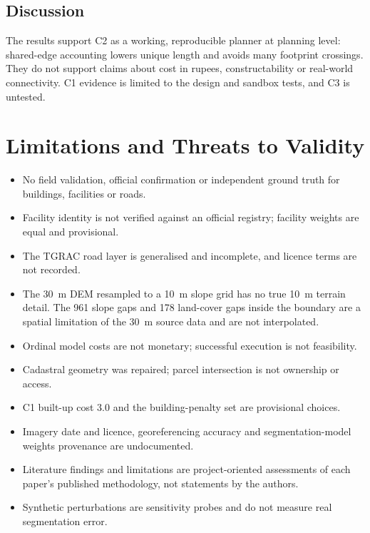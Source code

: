 \documentclass[12pt,a4paper]{report}
\begin{document}
\section{Discussion}
The results support C2 as a working, reproducible planner at planning level: shared-edge accounting lowers unique length and avoids many footprint crossings. They do not support claims about cost in rupees, constructability or real-world connectivity. C1 evidence is limited to the design and sandbox tests, and C3 is untested.

\chapter{Limitations and Threats to Validity}
\begin{itemize}[nosep]
\item No field validation, official confirmation or independent ground truth for buildings, facilities or roads.
\item Facility identity is not verified against an official registry; facility weights are equal and provisional.
\item The TGRAC road layer is generalised and incomplete, and licence terms are not recorded.
\item The 30~m DEM resampled to a 10~m slope grid has no true 10~m terrain detail. The 961 slope gaps and 178 land-cover gaps inside the boundary are a spatial limitation of the 30~m source data and are not interpolated.
\item Ordinal model costs are not monetary; successful execution is not feasibility.
\item Cadastral geometry was repaired; parcel intersection is not ownership or access.
\item C1 built-up cost 3.0 and the building-penalty set are provisional choices.
\item Imagery date and licence, georeferencing accuracy and segmentation-model weights provenance are undocumented.
\item Literature findings and limitations are project-oriented assessments of each paper's published methodology, not statements by the authors.
\item Synthetic perturbations are sensitivity probes and do not measure real segmentation error.
\end{itemize}
\end{document}
